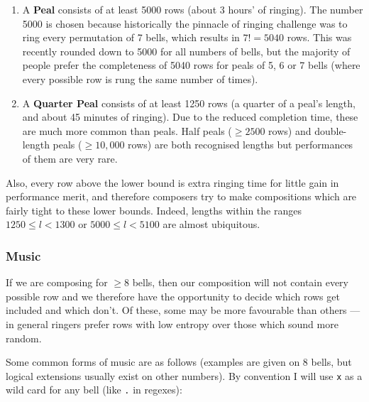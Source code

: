 \documentclass[12pt]{article}
\newcommand{\row}[1]{\texttt{#1}}
\begin{document}
\begin{enumerate}
    \item A \textbf{Peal} consists of at least 5000 rows (about 3 hours' of ringing).
        The number 5000 is chosen because historically the pinnacle of ringing challenge was to ring
        every permutation of 7 bells, which results in $7! = 5040$ rows.  This was recently rounded
        down to 5000 for all numbers of bells, but the majority of people prefer the completeness of
        5040 rows for peals of 5, 6 or 7 bells (where every possible row is rung the same number of
        times).
    \item A \textbf{Quarter Peal} consists of at least 1250 rows (a quarter of a peal's length, and
        about 45 minutes of ringing).  Due to the reduced completion time, these are much more
        common than peals.  Half peals ($\ge 2500$ rows) and double-length peals ($\ge 10,000$ rows)
        are both recognised lengths but performances of them are very rare.
\end{enumerate}

Also, every row above the lower bound is extra ringing time for little gain in performance merit,
and therefore composers try to make compositions which are fairly tight to these lower bounds.
Indeed, lengths within the ranges $1250 \le l < 1300$ or $5000 \le l < 5100$ are almost ubiquitous.

\subsubsection{Music}

If we are composing for $\ge 8$ bells, then our composition will not contain every possible row and
we therefore have the opportunity to decide which rows get included and which don't.  Of these, some
may be more favourable than others --- in general ringers prefer rows with low entropy over those
which sound more random.

Some common forms of music are as follows (examples are given on 8 bells, but logical extensions
usually exist on other numbers).  By convention I will use \row{x} as a wild card for any bell (like
\verb"." in regexes):
\end{document}
